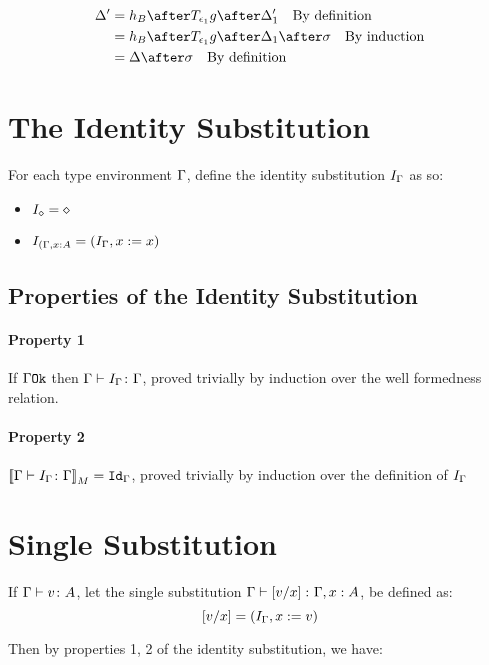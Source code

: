 {    \begin{align}
        \D' &= h_B\after\T{\e_1}{g}\after\D_1'\qt{By definition}\\
            &= h_B\after\T{\e_1}{g}\after\D_1\after\si\qt{By induction}\\
            &= \D\after\si\qt{By definition}\\
    \end{align}
    
    \section{The Identity Substitution}
    For each type environment $\G$, define the identity substitution $I_{\G}$ as so:

    \begin{itemize}
        \item $I_{\nil} = \nil$
        \item $I_{(\gax} = (I_{\G}, x\setto x)$
    \end{itemize}

    \subsection{Properties of the Identity Substitution}
    \paragraph{Property 1}
    If $\ok{\G}$ then $\typerelation{\G}{I_{\G}}{\G}$, proved trivially by induction over the well formedness relation.

    \paragraph{Property 2}
    $\deno{\typerelation{\G}{I_{\G}}{\G}} = \idg$, proved trivially by induction over the definition of $I_{\G}$
    \section{Single Substitution}

    If $\typerelation{\G}{v}{A}$, let the single substitution $\typerelation{\G}{\ssub{x}{v}}{\gax}$, be defined as:
    \begin{equation}
        \ssub{x}{v} = (I_{\G}, x\setto v)
    \end{equation}

    Then by properties 1, 2 of the identity substitution, we have:

}
